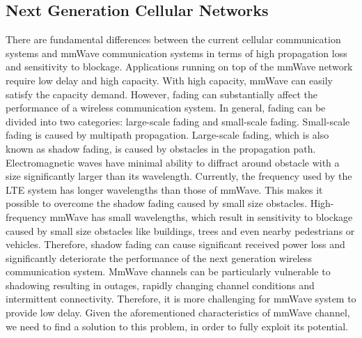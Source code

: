 \subsection{Next Generation Cellular Networks}
\label{subsec:1}
\par There are fundamental differences between the current cellular communication systems and mmWave communication systems in terms of high propagation loss and sensitivity to blockage. Applications running on top of the mmWave network require low delay and high capacity. With high capacity, mmWave can easily satisfy the capacity demand. However, fading can substantially affect the performance of a wireless communication system. In general, fading can be divided into two categories: large-scale fading and small-scale fading. Small-scale fading is caused by multipath propagation. Large-scale fading, which is also known as shadow fading, is caused by obstacles in the propagation path. Electromagnetic waves have minimal ability to diffract around obstacle with a size significantly larger than its wavelength. Currently, the frequency used by the LTE system has longer wavelengths than those of mmWave. This makes it possible to overcome the shadow fading caused by small size obstacles. High-frequency mmWave has small wavelengths, which result in sensitivity to blockage caused by small size obstacles like buildings, trees and even nearby pedestrians or vehicles. Therefore, shadow fading  can cause significant received power loss and significantly deteriorate the performance of the next generation wireless communication system. MmWave channels can be particularly vulnerable to shadowing resulting in outages, rapidly changing channel conditions and intermittent connectivity. Therefore, it is more challenging for mmWave system to provide low delay. Given the aforementioned characteristics of mmWave channel, we need to find a solution to this problem, in order to fully exploit its potential. 


